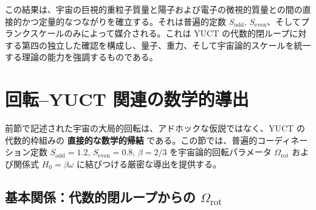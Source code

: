 \documentclass[11pt,a4paper]{article}
\newcommand{\Sodd}{S_{\mathrm{odd}}}
\newcommand{\Seven}{S_{\mathrm{even}}}
\begin{document}
	この結果は、宇宙の巨視的重粒子質量と陽子および電子の微視的質量との間の直接的かつ定量的なつながりを確立する。それは普遍的定数 \(\Sodd\), \(\Seven\)、そしてプランクスケールのみによって媒介される。これは YUCT の代数的閉ループに対する第四の独立した確認を構成し、量子、重力、そして宇宙論的スケールを統一する理論の能力を強調するものである。
	
	\section{回転–YUCT 関連の数学的導出}
	\label{sec:rotation-yuct}
	
	前節で記述された宇宙の大局的回転は、アドホックな仮説ではなく、YUCT の代数的枠組みの \textbf{直接的な数学的帰結} である。この節では、普遍的コーディネーション定数 \(S_{\mathrm{odd}}=1.2\), \(S_{\mathrm{even}}=0.8\), \(\beta = 2/3\) を宇宙論的回転パラメータ \(\Omega_{\mathrm{rot}}\) および関係式 \(H_0 = \beta\omega\) に結びつける厳密な導出を提供する。
	
	\subsection{基本関係：代数的閉ループからの \(\Omega_{\mathrm{rot}}\)}
	
\end{document}
